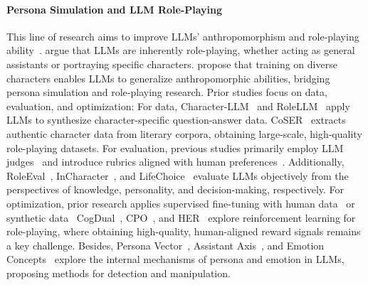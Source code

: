 \paragraph{Persona Simulation and LLM Role-Playing}
This line of research aims to improve LLMs' anthropomorphism and role-playing ability~\citep{chen2024from}.
\citet{shanahan2023role} argue that LLMs are inherently role-playing,
whether acting as general assistants or portraying specific characters.
\citet{wang2025coser} propose that training on diverse characters enables LLMs to generalize anthropomorphic abilities,
bridging persona simulation and role-playing research.
Prior studies focus on data, evaluation, and optimization:
For data,
Character-LLM~\citep{shao2023character} and RoleLLM~\citep{wang2023rolellm} apply LLMs to synthesize character-specific question-answer data.
CoSER~\citep{wang2025coser} extracts authentic character data from literary corpora,
obtaining large-scale, high-quality role-playing datasets.
For evaluation,
previous studies primarily employ LLM judges~\citep{wang2023rolellm, tu2024charactereval}
and introduce rubrics aligned with human preferences~\citep{wang2025coser, du2026her}.
Additionally, RoleEval~\citep{shen2023roleeval}, InCharacter~\citep{wang2024incharacter},
and LifeChoice~\citep{xu2024character}
evaluate LLMs objectively from the perspectives of knowledge, personality, and decision-making, respectively.
For optimization, 
prior research applies supervised fine-tuning with human data~\citep{wang2025coser, zhou2023characterglm}
or synthetic data~\citep{chan2024personahub, lu2024large}
CogDual~\citep{liu-etal-2025-cogdual}, CPO~\citep{ye-etal-2025-cpo}, and HER~\citep{du2026her}
explore reinforcement learning for role-playing,
where obtaining high-quality, human-aligned reward signals remains a key challenge.
Besides, Persona Vector~\citep{chen2025persona}, Assistant Axis~\citep{lu2026assistant},
and Emotion Concepts~\citep{sofroniew2026emotion}
explore the internal mechanisms of persona and emotion in LLMs,
proposing methods for detection and manipulation.


